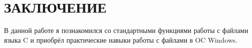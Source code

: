 \section*{ЗАКЛЮЧЕНИЕ}

В данной работе я познакомился со стандартными функциями работы с файлами языка C и приобрёл практические навыки работы с файлами в OC Windows.

\newpage